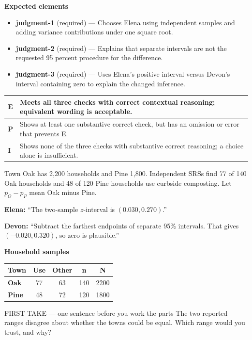 \documentclass[11pt]{article}
\begin{document}

\textbf{Expected elements}
\begin{itemize}[leftmargin=1.5em,itemsep=2pt,topsep=2pt]
  \item \textbf{judgment-1} (required) --- Chooses Elena using independent samples and adding variance contributions under one square root.
  \item \textbf{judgment-2} (required) --- Explains that separate intervals are not the requested 95 percent procedure for the difference.
  \item \textbf{judgment-3} (required) --- Uses Elena's positive interval versus Devon's interval containing zero to explain the changed inference.
\end{itemize}

{\small\renewcommand{\arraystretch}{1.25}
\noindent\begin{tabular}{|p{0.5in}|p{5.9in}|}
\hline
\textbf{E} & Meets all three checks with correct contextual reasoning; equivalent wording is acceptable. \\ \hline
\textbf{P} & Shows at least one substantive correct check, but has an omission or error that prevents E. \\ \hline
\textbf{I} & Shows none of the three checks with substantive correct reasoning; a choice alone is insufficient. \\ \hline
\end{tabular}}

\clearpage
{}

Town Oak has 2{,}200 households and Pine 1{,}800. Independent SRSs find 77 of 140 Oak households and 48 of 120 Pine households use curbside composting. Let $p_O-p_P$ mean Oak minus Pine.\par\smallskip \textbf{Elena:} ``The two-sample $z$-interval is $(0.030,0.270)$.''\par \textbf{Devon:} ``Subtract the farthest endpoints of separate 95\% intervals. That gives $(-0.020,0.320)$, so zero is plausible.''\par
\begin{center}
\textbf{Household samples}\par\smallskip
\begin{tabular}{|l|c|c|c|c|}
\hline
\textbf{Town} & \textbf{Use} & \textbf{Other} & \textbf{n} & \textbf{N} \\ \hline
\textbf{Oak} & 77 & 63 & 140 & 2200 \\ \hline
\textbf{Pine} & 48 & 72 & 120 & 1800 \\ \hline
\end{tabular}
\end{center}
\begin{firsttakebox}{FIRST TAKE --- one sentence before you work the parts}
The two reported ranges disagree about whether the towns could be equal. Which range would you trust, and why?\par
{}
\end{firsttakebox}
\end{document}
